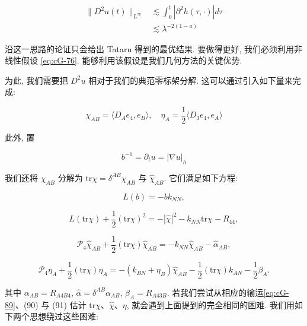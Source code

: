 \[
\begin{aligned}
\| D ^ {2} u (t) \| _ {L ^ {\infty}} &\lesssim \int_ {0} ^ {t} | \partial^ {2} h (\tau ,  \cdot) | d \tau \\
&\lesssim \lambda^ {- 2 (1 - a)}
\end{aligned}
\]

沿这一思路的论证只会给出 Tataru 得到的最优结果. 要做得更好, 我们必须利用非线性假设 \eqref{eq:cG-76}. 能够利用该假设是我们几何方法的关键优势. 

为此, 我们需要把 $D^{2}u$ 相对于我们的典范零标架分解. 这可以通过引入如下量来完成:

\begin{equation}
\chi_ {A B} = \langle D _ {A} e _ {4},  e _ {B} \rangle,  \quad \eta_ {A} = \frac {1}{2} \langle D _ {3} e _ {4},  e _ {A} \rangle\label{eq:cG-87}
\end{equation}

此外, 置

\[
b ^ {- 1} = \partial_ {t} u = | \nabla u | _ {h}
\]

我们还将 $\chi_{AB}$ 分解为 $\mathrm{tr}\chi = \delta^{AB}\chi_{AB}$ 与 $\hat{\chi}_{AB}$. 它们满足如下方程:

\begin{equation}
L (b) = - b k _ {N N}, \label{eq:cG-88}
\end{equation}

\begin{equation}
L (\mathrm{tr} \chi) + \frac {1}{2} (\mathrm{tr} \chi) ^ {2} = - | \hat {\chi} | ^ {2} - k _ {N N} \mathrm{tr} \chi - R _ {4 4}, \label{eq:cG-89}
\end{equation}

\begin{equation}
\mathcal {P} _ {4} \hat {\chi} _ {A B} + \frac {1}{2} (\mathrm{tr} \chi) \hat {\chi} _ {A B} = - k _ {N N} \hat {\chi} _ {A B} - \hat {\alpha} _ {A B}, \label{eq:cG-90}
\end{equation}

\begin{equation}
\mathcal {P} _ {4} \eta_ {A} + \frac {1}{2} (\mathrm{tr} \chi) \eta_ {A} = - (k _ {B N} + \eta_ {B}) \hat {\chi} _ {A B} - \frac {1}{2} (\mathrm{tr} \chi) k _ {A N} - \frac {1}{2} \beta_ {A}.\label{eq:cG-91}
\end{equation}

其中 $\alpha_{AB} = R_{A4B4}$, $\hat{\alpha} = \delta^{AB}\alpha_{AB}$, $\beta_A = R_{A43B}$. 若我们尝试从相应的输运\eqref{eq:cG-89}、(90) 与 (91) 估计 $\mathrm{tr}\chi$、$\hat{\chi}$、$\eta$, 就会遇到上面提到的完全相同的困难. 我们用如下两个思想绕过这些困难:


